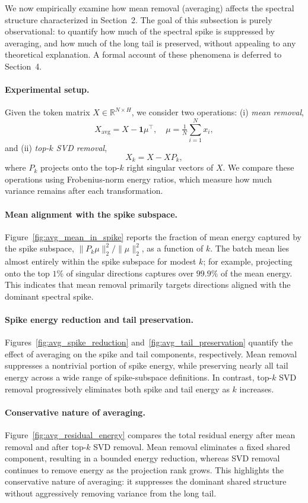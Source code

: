 We now empirically examine how mean removal (averaging) affects the spectral
structure characterized in Section~2.
The goal of this subsection is purely observational: to quantify how much of the
spectral spike is suppressed by averaging, and how much of the long tail is
preserved, without appealing to any theoretical explanation.
A formal account of these phenomena is deferred to Section~4.

\paragraph{Experimental setup.}
Given the token matrix $X \in \mathbb{R}^{N\times H}$, we consider two operations:
(i) \emph{mean removal},
\[
X_{\mathrm{avg}} = X - \mathbf{1}\mu^\top,
\quad
\mu = \tfrac{1}{N}\sum_{i=1}^N x_i,
\]
and (ii) \emph{top-$k$ SVD removal},
\[
X_k = X - X P_k,
\]
where $P_k$ projects onto the top-$k$ right singular vectors of $X$.
We compare these operations using Frobenius-norm energy ratios, which measure how
much variance remains after each transformation.

\paragraph{Mean alignment with the spike subspace.}
Figure~\ref{fig:avg_mean_in_spike} reports the fraction of mean energy captured by
the spike subspace, $\|P_k\mu\|_2^2 / \|\mu\|_2^2$, as a function of $k$.
The batch mean lies almost entirely within the spike subspace for modest $k$; for
example, projecting onto the top $1\%$ of singular directions captures over
$99.9\%$ of the mean energy.
This indicates that mean removal primarily targets directions aligned with the
dominant spectral spike.

\paragraph{Spike energy reduction and tail preservation.}
Figures~\ref{fig:avg_spike_reduction} and~\ref{fig:avg_tail_preservation} quantify
the effect of averaging on the spike and tail components, respectively.
Mean removal suppresses a nontrivial portion of spike energy, while preserving
nearly all tail energy across a wide range of spike-subspace definitions.
In contrast, top-$k$ SVD removal progressively eliminates both spike and tail
energy as $k$ increases.

\paragraph{Conservative nature of averaging.}
Figure~\ref{fig:avg_residual_energy} compares the total residual energy after mean
removal and after top-$k$ SVD removal.
Mean removal eliminates a fixed shared component, resulting in a bounded energy
reduction, whereas SVD removal continues to remove energy as the projection rank
grows.
This highlights the conservative nature of averaging: it suppresses the dominant
shared structure without aggressively removing variance from the long tail.


